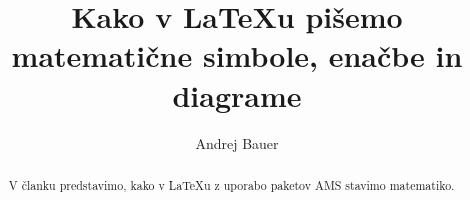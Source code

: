 \documentclass{amsart}
\title[Matematika v {\LaTeX}u]{Kako v {\LaTeX}u pišemo matematične simbole, enačbe in diagrame}
\author{Andrej Bauer}
\begin{document}
\maketitle

\begin{abstract}
  V članku predstavimo, kako v {\LaTeX}u z uporabo paketov AMS stavimo matematiko.
\end{abstract}








\end{document}
